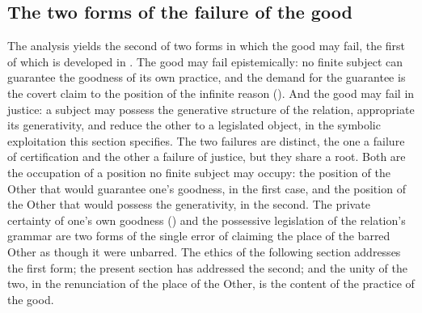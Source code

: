 \subsection{The two forms of the failure of the good}
\label{p10:sec:exp-twoforms}

The analysis yields the second of two forms in which the good may fail, the first of which is developed in . The good may fail epistemically: no finite subject can guarantee the goodness of its own practice, and the demand for the guarantee is the covert claim to the position of the infinite reason (). And the good may fail in justice: a subject may possess the generative structure of the relation, appropriate its generativity, and reduce the other to a legislated object, in the symbolic exploitation this section specifies. The two failures are distinct, the one a failure of certification and the other a failure of justice, but they share a root. Both are the occupation of a position no finite subject may occupy: the position of the Other that would guarantee one's goodness, in the first case, and the position of the Other that would possess the generativity, in the second. The private certainty of one's own goodness () and the possessive legislation of the relation's grammar are two forms of the single error of claiming the place of the barred Other as though it were unbarred. The ethics of the following section addresses the first form; the present section has addressed the second; and the unity of the two, in the renunciation of the place of the Other, is the content of the practice of the good.
